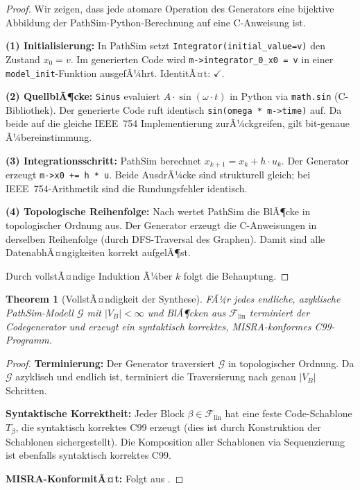 ﻿\documentclass[12pt,a4paper]{article}
\newtheorem{theorem}{Theorem}[section]
\theoremstyle{definition}
\begin{document}
\begin{proof}
Wir zeigen, dass jede atomare Operation des Generators eine bijektive Abbildung
der PathSim-Python-Berechnung auf eine C-Anweisung ist.

\textbf{(1) Initialisierung:} In PathSim setzt \texttt{Integrator(initial\_value=v)}
den Zustand $x_0 = v$. Im generierten Code wird \texttt{m->integrator\_0\_x0 = v}
in einer \texttt{model\_init}-Funktion ausgefÃ¼hrt. IdentitÃ¤t: $\checkmark$.

\textbf{(2) QuellblÃ¶cke:} \texttt{Sinus} evaluiert
$A\cdot\sin(\omega\cdot t)$ in Python via \texttt{math.sin} (C-Bibliothek).
Der generierte Code ruft identisch \texttt{sin(omega * m->time)} auf.
Da beide auf die gleiche IEEE~754 Implementierung zurÃ¼ckgreifen, gilt
bit-genaue Ã¼bereinstimmung.

\textbf{(3) Integrationsschritt:} PathSim berechnet $x_{k+1} = x_k + h \cdot u_k$.
Der Generator erzeugt \texttt{m->x0 += h * u}. Beide AusdrÃ¼cke sind
strukturell gleich; bei IEEE~754-Arithmetik sind die Rundungsfehler identisch.

\textbf{(4) Topologische Reihenfolge:} Nach  wertet PathSim
die BlÃ¶cke in topologischer Ordnung aus. Der Generator erzeugt die
C-Anweisungen in derselben Reihenfolge (durch DFS-Traversal des Graphen).
Damit sind alle DatenabhÃ¤ngigkeiten korrekt aufgelÃ¶st.

Durch vollstÃ¤ndige Induktion Ã¼ber $k$ folgt die Behauptung.
\end{proof}

\begin{theorem}[VollstÃ¤ndigkeit der Synthese]
\label{thm:complete}
FÃ¼r jedes endliche, azyklische PathSim-Modell $\mathcal{G}$ mit
$|V_B| < \infty$ und BlÃ¶cken aus $\mathcal{F}_{\mathrm{lin}}$ terminiert
der Codegenerator und erzeugt ein syntaktisch korrektes, MISRA-konformes
C99-Programm.
\end{theorem}

\begin{proof}
\textbf{Terminierung:} Der Generator traversiert $\mathcal{G}$ in topologischer
Ordnung. Da $\mathcal{G}$ azyklisch und endlich ist, terminiert die Traversierung
nach genau $|V_B|$ Schritten.

\textbf{Syntaktische Korrektheit:} Jeder Block $\beta \in \mathcal{F}_{\mathrm{lin}}$
hat eine feste Code-Schablone $T_\beta$, die syntaktisch korrektes C99 erzeugt
(dies ist durch Konstruktion der Schablonen sichergestellt). Die Komposition
aller Schablonen via Sequenzierung ist ebenfalls syntaktisch korrektes C99.

\textbf{MISRA-KonformitÃ¤t:} Folgt aus .
\end{proof}
\end{document}
